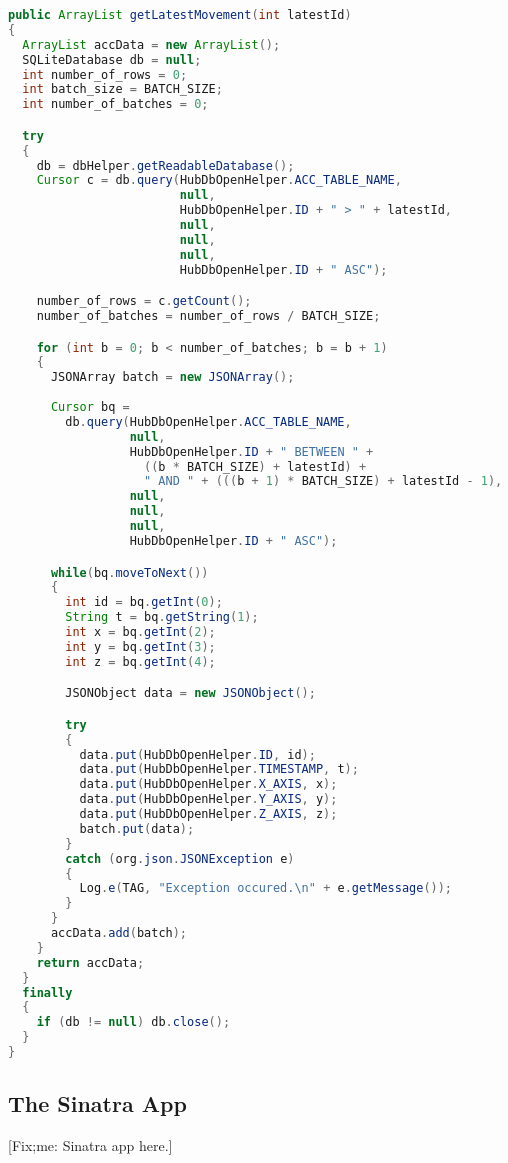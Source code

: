 \documentclass[11pt, a4paper, oneside, english]{scrbook}
\begin{document}
\begin{lstlisting}[language=Java, numbers=none]
public ArrayList getLatestMovement(int latestId)
{
  ArrayList accData = new ArrayList();
  SQLiteDatabase db = null;
  int number_of_rows = 0;
  int batch_size = BATCH_SIZE;
  int number_of_batches = 0;

  try
  {
    db = dbHelper.getReadableDatabase();
    Cursor c = db.query(HubDbOpenHelper.ACC_TABLE_NAME,
                        null,
                        HubDbOpenHelper.ID + " > " + latestId,
                        null,
                        null,
                        null,
                        HubDbOpenHelper.ID + " ASC");

    number_of_rows = c.getCount();
    number_of_batches = number_of_rows / BATCH_SIZE;

    for (int b = 0; b < number_of_batches; b = b + 1)
    {
      JSONArray batch = new JSONArray();
        
      Cursor bq = 
        db.query(HubDbOpenHelper.ACC_TABLE_NAME,
                 null,
                 HubDbOpenHelper.ID + " BETWEEN " + 
                   ((b * BATCH_SIZE) + latestId) + 
                   " AND " + (((b + 1) * BATCH_SIZE) + latestId - 1),
                 null,
                 null,
                 null,
                 HubDbOpenHelper.ID + " ASC");

      while(bq.moveToNext())
      {
        int id = bq.getInt(0);
        String t = bq.getString(1);
        int x = bq.getInt(2);
        int y = bq.getInt(3);
        int z = bq.getInt(4);

        JSONObject data = new JSONObject();

        try
        {
          data.put(HubDbOpenHelper.ID, id);
          data.put(HubDbOpenHelper.TIMESTAMP, t);
          data.put(HubDbOpenHelper.X_AXIS, x);
          data.put(HubDbOpenHelper.Y_AXIS, y);
          data.put(HubDbOpenHelper.Z_AXIS, z);
          batch.put(data);
        }
        catch (org.json.JSONException e)
        {
          Log.e(TAG, "Exception occured.\n" + e.getMessage());
        }
      }
      accData.add(batch);
    }
    return accData;
  }
  finally
  {
    if (db != null) db.close();
  }
}
\end{lstlisting}
\subsection{The Sinatra App} %
\label{sub:the_sinatra_app}
[Fix;me: Sinatra app here.]
\end{document}
